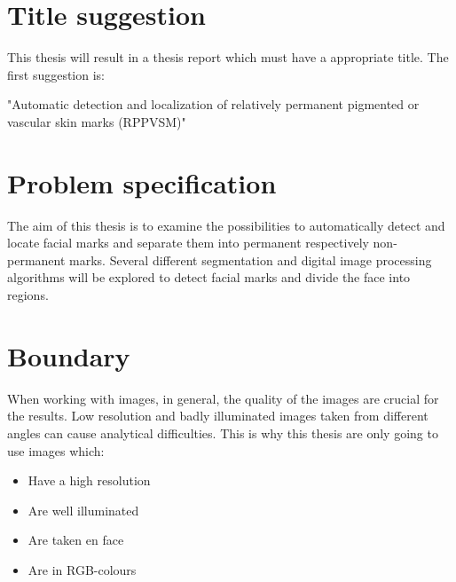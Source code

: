 \documentclass{article}
\begin{document}
\section{Title suggestion}

This thesis will result in a thesis report which must have a appropriate title. The first suggestion is: 

\begin{displayquote}
"Automatic detection and localization of relatively permanent pigmented or vascular skin marks (RPPVSM)"
\end{displayquote}

\section{Problem specification}

The aim of this thesis is to examine the possibilities to automatically detect and locate facial marks and separate them into permanent respectively non-permanent marks. Several different segmentation and digital image processing algorithms will be explored to detect facial marks and divide the face into regions. 

\section{Boundary}

When working with images, in general, the quality of the images are crucial for the results. Low resolution and badly illuminated images taken from different angles can cause analytical difficulties. This is why this thesis are only going to use images which:

\begin{itemize}
	\item Have a high resolution
	\item Are well illuminated
	\item Are taken en face
	\item Are in RGB-colours 
\end{itemize}









\newpage


\end{document}
